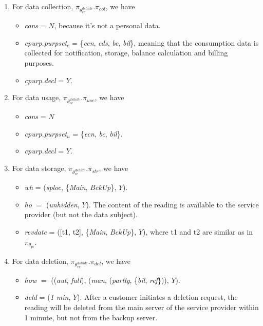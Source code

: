 \documentclass[a4paper]{article}
\begin{document}
\begin{enumerate}
\item For data collection, $\pi_{\theta^{dshide}_{ec}}$.$\pi_{col}$, we have 
\begin{itemize}
\item \textit{cons} = $N$, because it's not a personal data.  
\item  \textit{cpurp}.\textit{purpset}$_c$ = \{\textit{ecn},  \textit{cds}, \textit{bc}, \textit{bil}\}, meaning that the consumption data is collected for notification, storage, balance calculation and billing purposes.  
\item \textit{cpurp}.\textit{decl} = $Y$.  
\end{itemize}

\item For data usage, $\pi_{\theta^{dshide}_{ec}}$.$\pi_{use}$, we have 
\begin{itemize}
\item \textit{cons} = $N$ 
\item  \textit{cpurp}.\textit{purpset}$_u$ = \{\textit{ecn},   \textit{bc}, \textit{bil}\}. 
\item \textit{cpurp}.\textit{decl} = $Y$.  
\end{itemize}

\item For data storage, $\pi_{\theta^{dshide}_{ec}}$.$\pi_{str}$, we have 
\begin{itemize} 
\item \textit{wh} = (\textit{sploc}, \{\textit{Main}, \textit{BckUp}\}, $Y$).     

\item \textit{ho} $=$ (\textit{unhidden},  $Y$). The content of the reading is available to the service provider (but not the data subject).

\item \textit{revdate} = ([t1, t2], \{\textit{Main}, \textit{BckUp}\}, $Y$), where t1 and t2 are similar as in $\pi_{\theta_{pi}}$.   
\end{itemize}   

\item For data deletion, $\pi_{\theta^{dshide}_{ec}}$.$\pi_{del}$, we have 
\begin{itemize} 
\item \textit{how} $=$ ((\textit{aut}, \textit{full}), (\textit{man}, (\textit{partly}, \{\textit{bil}, \textit{ref}\})), $Y$). 

\item \textit{deld} = (\textit{1 min}, $Y$).  After a customer initiates a deletion request, the reading will be deleted from the main server of the service provider within 1 minute, but not from the backup server.          


\end{itemize}
\end{enumerate}
\end{document}
